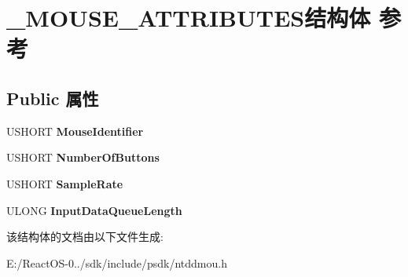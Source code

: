 \hypertarget{struct___m_o_u_s_e___a_t_t_r_i_b_u_t_e_s}{}\section{\+\_\+\+M\+O\+U\+S\+E\+\_\+\+A\+T\+T\+R\+I\+B\+U\+T\+E\+S结构体 参考}
\label{struct___m_o_u_s_e___a_t_t_r_i_b_u_t_e_s}
\subsection*{Public 属性}
\begin{DoxyCompactItemize}
\item 
\mbox{\label{struct___m_o_u_s_e___a_t_t_r_i_b_u_t_e_s_a3a7e814f7a7964c77126b97e85917deb}} 
U\+S\+H\+O\+RT {\bfseries Mouse\+Identifier}
\item 
\mbox{\label{struct___m_o_u_s_e___a_t_t_r_i_b_u_t_e_s_af749230985426a17ec91313c0ebd448a}} 
U\+S\+H\+O\+RT {\bfseries Number\+Of\+Buttons}
\item 
\mbox{\label{struct___m_o_u_s_e___a_t_t_r_i_b_u_t_e_s_ab675e54e59f88b7e7bb16095fe60b256}} 
U\+S\+H\+O\+RT {\bfseries Sample\+Rate}
\item 
\mbox{\label{struct___m_o_u_s_e___a_t_t_r_i_b_u_t_e_s_a3bb3bcbdda26904b044d3a7c392444a9}} 
U\+L\+O\+NG {\bfseries Input\+Data\+Queue\+Length}
\end{DoxyCompactItemize}


该结构体的文档由以下文件生成\+:\begin{DoxyCompactItemize}
\item 
E\+:/\+React\+O\+S-\/0../sdk/include/psdk/ntddmou.\+h\end{DoxyCompactItemize}
